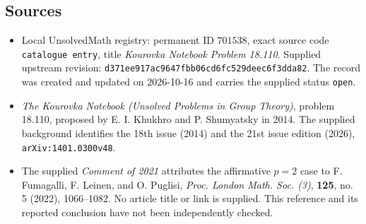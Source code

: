 \documentclass[11pt]{article}
\begin{document}
\subsection{Sources}
\begin{itemize}
\item Local UnsolvedMath registry: permanent ID \(701538\), exact source code \texttt{catalogue entry}, title \emph{Kourovka Notebook Problem 18.110}. Supplied upstream revision: \texttt{d371ee917ac9647fbb06cd6fc529deec6f3dda82}. The record was created and updated on 2026-10-16 and carries the supplied status \texttt{open}.
\item \emph{The Kourovka Notebook (Unsolved Problems in Group Theory)}, problem 18.110, proposed by E. I. Khukhro and P. Shumyatsky in 2014. The supplied background identifies the 18th issue (2014) and the 21st issue edition (2026), \texttt{arXiv:1401.0300v48}.
\item The supplied \emph{Comment of 2021} attributes the affirmative \(p=2\) case to F. Fumagalli, F. Leinen, and O. Puglisi, \emph{Proc. London Math. Soc. (3)}, \textbf{125}, no. 5 (2022), 1066--1082. No article title or link is supplied. This reference and its reported conclusion have not been independently checked.
\end{itemize}
\end{document}
